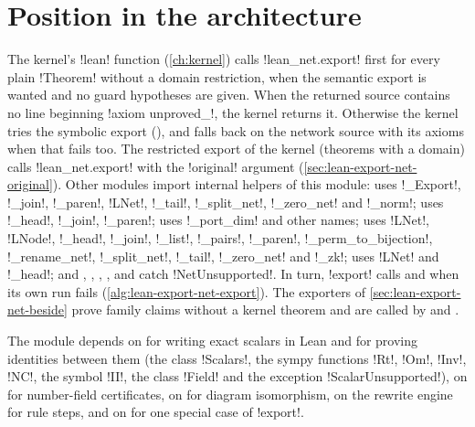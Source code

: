 {\section{Position in the architecture}\label{sec:lean-export-net-position}

The kernel's \py!lean! function (\cref{ch:kernel}) calls \py!lean_net.export! first for every
plain \py!Theorem! without a domain restriction, when the semantic export is wanted and no guard
hypotheses are given. When the returned source contains no line beginning
\code!axiom unproved_!, the kernel returns it. Otherwise the kernel tries the symbolic export
(), and falls back on the network source with its axioms
when that fails too. The restricted export of the kernel (theorems with a domain) calls
\py!lean_net.export! with the \py!original! argument (\cref{sec:lean-export-net-original}). Other
modules import internal helpers of this module:
 uses \py!_Export!, \py!_join!, \py!_paren!, \py!LNet!,
\py!_tail!, \py!_split_net!, \py!_zero_net! and \py!_norm!;
 uses \py!_head!, \py!_join!, \py!_paren!;
 uses \py!_port_dim! and other names;
 uses \py!LNet!, \py!LNode!, \py!_head!, \py!_join!,
\py!_list!, \py!_pairs!, \py!_paren!, \py!_perm_to_bijection!, \py!_rename_net!,
\py!_split_net!, \py!_tail!, \py!_zero_net! and \py!_zk!;
 uses \py!LNet! and \py!_head!; and
, ,
, ,
 and
 catch \py!NetUnsupported!. In turn, \py!export!
calls  and
 when its own run fails
(\cref{alg:lean-export-net-export}). The exporters of
\cref{sec:lean-export-net-beside} prove family claims without a kernel theorem and are called by
 and .

The module depends on  for writing exact scalars in Lean
and for proving identities between them (the class \py!Scalars!, the sympy functions \py!Rt!,
\py!Om!, \py!Inv!, \py!NC!, the symbol \py!II!, the class \py!Field! and the exception
\py!ScalarUnsupported!), on  for number-field certificates,
on  for diagram isomorphism, on the rewrite engine for rule
steps, and on  for one special case of
\py!export!.

}
